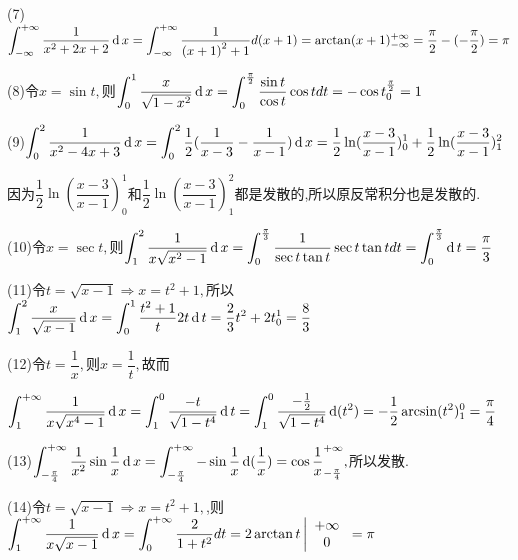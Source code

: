 (7)$\displaystyle\int_{ - \infty }^{ + \infty } {\dfrac{1}{{{x^2} + 2x + 2}}\operatorname{\mathop{}\!\mathrm{d}} x}  = \displaystyle\int_{ - \infty }^{ + \infty } {\dfrac{1}{{{{(x + 1)}^2} + 1}}d(x + 1) = \arctan (x + 1)_{ - \infty }^{ + \infty }}  = \dfrac{\pi }{2} - ( - \dfrac{\pi }{2}) = \pi $

(8)令$x = \sin t,$则$\displaystyle\int_0^1 {\dfrac{x}{{\sqrt {1 - {x^2}} }}} \operatorname{\mathop{}\!\mathrm{d}} x = \displaystyle\int_0^{\frac{\pi }{2}} {\dfrac{{\sin t}}{{\cos t}}\cos tdt =  - \cos t_0^{\frac{\pi }{2}}}  = 1$

(9)$\displaystyle\int_0^2 {\dfrac{1}{{{x^2} - 4x + 3}}\operatorname{\mathop{}\!\mathrm{d}} x}  = \displaystyle\int_0^2 {\dfrac{1}{2}} (\dfrac{1}{{x - 3}} - \dfrac{1}{{x - 1}})\operatorname{\mathop{}\!\mathrm{d}} x = \frac{1}{2}\ln (\dfrac{{x - 3}}{{x - 1}})_0^1 + \dfrac{1}{2}\ln (\dfrac{{x - 3}}{{x - 1}})_1^2$

因为$\dfrac{1}{2}\ln (\dfrac{{x - 3}}{{x - 1}})_0^1$和$\dfrac{1}{2}\ln (\dfrac{{x - 3}}{{x - 1}})_1^2$都是发散的,所以原反常积分也是发散的.

(10)令$x = \sec t,$则$\displaystyle\int_1^2 {\dfrac{1}{{x\sqrt {{x^2} - 1} }}\operatorname{\mathop{}\!\mathrm{d}} x}  = \displaystyle\int_0^{\frac{\pi }{3}} {\dfrac{1}{{\sec t\tan t}}\sec t\tan tdt = \displaystyle\int_0^{\frac{\pi }{3}} {\operatorname{\mathop{}\!\mathrm{d}} t}  = \dfrac{\pi }{3}} $

(11)令$t = \sqrt {x - 1}  \Rightarrow x = {t^2} + 1,$所以$\displaystyle\int_1^2 {\dfrac{x}{{\sqrt {x - 1} }}\operatorname{\mathop{}\!\mathrm{d}} x}  = \displaystyle\int_0^1 {\dfrac{{{t^2} + 1}}{t}} 2t\operatorname{\mathop{}\!\mathrm{d}} t = \dfrac{2}{3}{t^2} + 2t_0^1 = \dfrac{8}{3}$

(12)令$t = \dfrac{1}{x},$则$x = \dfrac{1}{t},$故而

$\displaystyle\int_1^{ + \infty } {\dfrac{1}{{x\sqrt {{x^4} - 1} }}\operatorname{\mathop{}\!\mathrm{d}} x}  = \displaystyle\int_1^0 {\dfrac{{ - t}}{{\sqrt {1 - {t^4}} }}} \operatorname{\mathop{}\!\mathrm{d}} t = \displaystyle\int_1^0 {\dfrac{{ - \frac{1}{2}}}{{\sqrt {1 - {t^4}} }}} \operatorname{\mathop{}\!\mathrm{d}} ({t^2}) =  - \dfrac{1}{2}\arcsin ({t^2})_1^0 = \dfrac{\pi }{4}$

(13)$\displaystyle\int_{ - \frac{\pi }{4}}^{ + \infty } {\dfrac{1}{{{x^2}}}} \sin \dfrac{1}{x}\operatorname{\mathop{}\!\mathrm{d}} x = \displaystyle\int_{ - \frac{\pi }{4}}^{ + \infty } { - \sin \dfrac{1}{x}} \operatorname{\mathop{}\!\mathrm{d}} (\dfrac{1}{x}) = \cos \dfrac{1}{x}_{ - \frac{\pi }{4}}^{ + \infty },$所以发散.

(14)令$t = \sqrt {x - 1}  \Rightarrow x = {t^2} + 1,$,则$\displaystyle\int_1^{ + \infty } {\dfrac{1}{{x\sqrt {x - 1} }}\rd x = \displaystyle\int_0^{ + \infty } {\frac{2}{{1 + {t^2}}}} } dt = 2\arctan t\left| {\begin{array}{*{20}{c}}
  { + \infty } \\
  0
\end{array}} \right. = \pi $

